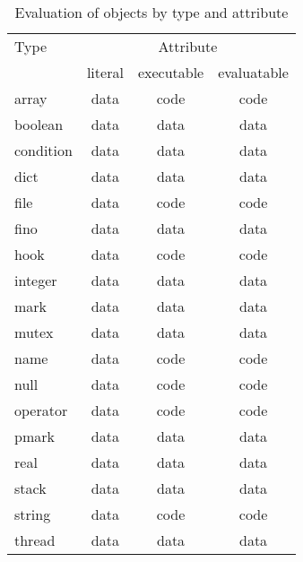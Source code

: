 \begin{table}[htb]
\begin{center}
\begin{tabular}{|l|c|c|c|}
\hline
Type		& \multicolumn{3}{|c|}{Attribute}	\\
\cline{2-4}
		& literal & executable & evaluatable	\\
\hline \hline
array		& data	& code	& code	\\
\hline
boolean		& data	& data	& data	\\
\hline
condition	& data	& data	& data	\\
\hline
dict		& data	& data	& data	\\
\hline
file		& data	& code	& code	\\
\hline
fino		& data	& data	& data	\\
\hline
hook		& data	& code	& code	\\
\hline
integer		& data	& data	& data	\\
\hline
mark		& data	& data	& data	\\
\hline
mutex		& data	& data	& data	\\
\hline
name		& data	& code	& code	\\
\hline
null		& data	& code	& code	\\
\hline
operator	& data	& code	& code	\\
\hline
pmark		& data	& data	& data	\\
\hline
real		& data	& data	& data	\\
\hline
stack		& data	& data	& data	\\
\hline
string		& data	& code	& code	\\
\hline
thread		& data	& data	& data	\\
\hline
\end{tabular}
\end{center}
\caption{\label{eval-act}
Evaluation of objects by type and attribute}
\end{table}

